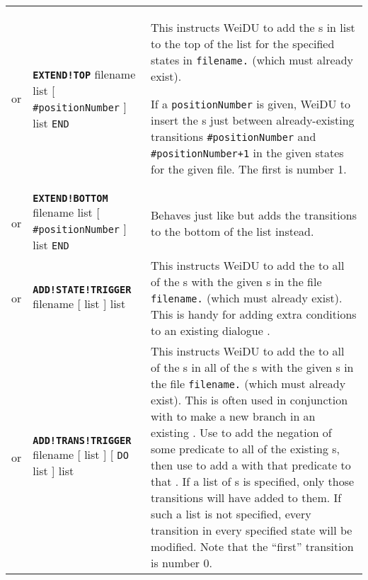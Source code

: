 \documentclass{article}
\def\ttref#1{\ahrefloc{#1}{\tt #1}}
\def\DEFINE#1{{\tt \bf #1}\label{#1}\index{#1}}
\def\t#1{{\tt #1}}
\def\Slist{{\color{red} list }}
\def\Ob{{\color{red} [ }}
\def\Oe{{\color{red} ] }}
\begin{document}
\begin{tabular}{cp{10in}|p{10in}}
  or   &
  \DEFINE{EXTEND!TOP}
    filename \ttref{stateLabel} \Slist \Ob {\tt \#positionNumber} \Oe
      \ttref{transition} \Slist \t{END} &
  This instructs WeiDU to add the \ttref{transition}s in list to the top of
  the \ttref{transition} list for the specified states in \t{filename.}\ttref{DLG}
  (which must already exist). 

  If a \t{positionNumber} is given, WeiDU to insert the \ttref{transition}s
  just between already-existing transitions \t{\#positionNumber} and
  \t{\#positionNumber+1} in the given states for the given file. The first
  \ttref{transition} is number 1.  \\

  or & \DEFINE{EXTEND!BOTTOM} filename \ttref{stateNumber} \Slist \Ob {\tt
  \#positionNumber} \Oe \ttref{transition} \Slist \t{END} &
  Behaves just like \ttref{EXTEND!TOP} but adds the transitions to the
  bottom of the list instead.  \\

  or & \DEFINE{ADD!STATE!TRIGGER} filename \ttref{stateNumber} 
    \ttref{stateTriggerString} \Ob \ttref{stateNumber} \Slist \Oe
	\ttref{dActionWhen} \Slist &
  This instructs WeiDU to add the \ttref{stateTriggerString} to all
  of the \ttref{state}s with the given \ttref{stateNumber}s in 
  the file \t{filename.}\ttref{DLG} (which must already exist). This is handy for
  adding extra conditions to an existing dialogue \ttref{state}. \\

  or & \DEFINE{ADD!TRANS!TRIGGER} filename \ttref{stateNumber} 
    \ttref{transTriggerString} \Ob \ttref{moreStateNumbers} \Slist \Oe 
    \Ob \t{DO} \ttref{transNumber} \Slist \Oe \ttref{dActionWhen} \Slist
    &
  This instructs WeiDU to add the \ttref{transTriggerString} to all
  of the \ttref{transition}s in all of the \ttref{state}s with the given
  \ttref{stateNumber}s in the file \t{filename.}\ttref{DLG} (which must already
  exist). This is often used in conjunction with \ttref{EXTEND!BOTTOM} to
  make a new branch in an existing \ttref{state}. Use
  \ttref{ADD!TRANS!TRIGGER} to add the negation of some predicate to all of
  the existing \ttref{transition}s, then use \ttref{EXTEND!BOTTOM} to add a
  \ttref{transition} with that predicate to that \ttref{state}. 
  If a list of \ttref{transNumber}s is specified, only those transitions 
  will have \ttref{transTriggerString} added to them. If such a list is not
  specified, every transition in every specified state will be modified.
  Note that the ``first'' transition is number 0. 
  \\


\end{tabular}
\end{document}
